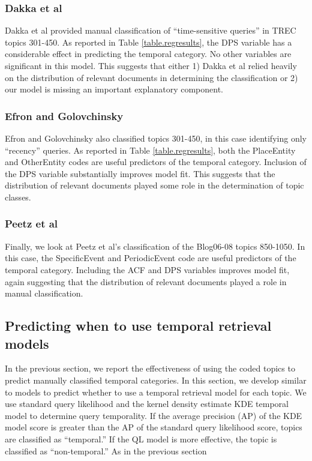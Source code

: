 \documentclass{sig-alternate}
\begin{document}
\subsubsection{Dakka et al}

Dakka et al provided manual classification of ``time-sensitive queries'' in TREC topics 301-450. As reported in Table \ref{table.regresults}, the DPS variable has a considerable effect in predicting the temporal category. No other variables are significant in this model.  This suggests that either 1) Dakka et al relied heavily on the distribution of relevant documents in determining the classification or 2) our model is missing an important explanatory component.

\subsubsection{Efron and Golovchinsky}

Efron and Golovchinsky also classified topics 301-450, in this case identifying only ``recency'' queries.  As reported in Table \ref{table.regresults}, both the PlaceEntity and OtherEntity codes are useful predictors of the temporal category. Inclusion of the DPS variable substantially improves model fit. This suggests that the distribution of relevant documents played some role in the determination of topic classes.

\subsubsection{Peetz et al}
Finally, we look at Peetz et al's classification of the Blog06-08 topics 850-1050.  In this case, the SpecificEvent and PeriodicEvent code are useful predictors of the temporal category. Including the ACF and DPS variables improves model fit, again suggesting that the distribution of relevant documents played a role in manual classification.

\subsection{Predicting when to use temporal retrieval models}

In the previous section, we report the effectiveness of using the coded topics to predict manually classified temporal categories.  In this section, we develop similar to models to predict whether to use a temporal retrieval model for each topic. We use standard query likelihood \cite{XXX} and the kernel density estimate {KDE} temporal model \cite{Efron2014} to determine query temporality. If the average precision (AP) of the KDE model score is greater than the AP of the standard query likelihood score, topics are classified as ``temporal.''  If the QL model is more effective, the topic is classified as ``non-temporal.'' As in the previous section
\end{document}
